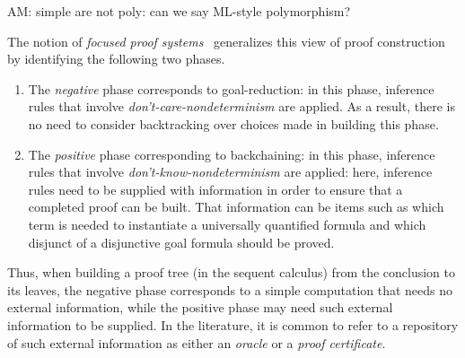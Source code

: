 \begin{metanote}
AM:  simple are not poly: can we say ML-style polymorphism?
\end{metanote}



{\color{red}
The notion of \emph{focused proof systems}~\cite{andreoli92jlc,liang09tcs}
generalizes this view of proof construction by identifying the
following two phases. %
\begin{enumerate}
\item The \emph{negative}%
%
  phase corresponds to  goal-reduction: in this phase,
  inference rules that involve \emph{don't-care-non\-de\-ter\-min\-ism} are
  applied.
%
  As a result, there is no need to consider backtracking over choices
  made in building this phase.

\item The \emph{positive} phase corresponding to  backchaining: in this phase, inference rules that involve
  \emph{don't-know-non\-de\-ter\-min\-ism} are applied: here,
  inference rules need to be supplied with information in order to
  ensure that a completed proof can be built.
%
  That information can be items such as which term is needed to
  instantiate a universally quantified formula and which disjunct of a
  disjunctive goal formula should be proved.
\end{enumerate}
%
Thus, when building a proof tree (in the sequent calculus) from the
conclusion to its leaves, the negative phase corresponds to a simple
computation that needs no external information, while the positive
phase may need such external information to be supplied.
%
In the literature, it is common to refer to a repository of such
external information as either an \emph{oracle} or a \emph{proof
certificate}.
}

